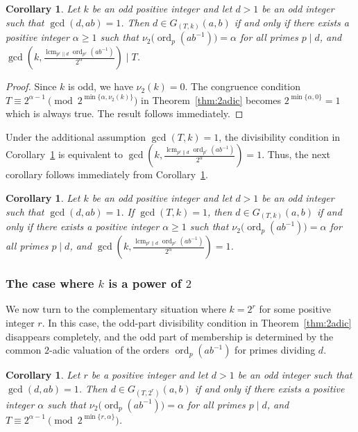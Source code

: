 \documentclass[pdflatex,sn-mathphys-num]{sn-jnl}%
\theoremstyle{thmstyleone}%
\newtheorem{corollary}[theorem]{Corollary}%
\theoremstyle{thmstyletwo}%
\theoremstyle{thmstylethree}%
\newcommand{\ord}{\operatorname{ord}}
\newcommand{\lcm}{\operatorname{lcm}}
\begin{document}
\begin{corollary}\label{thm:k-odd}
Let $k$ be an odd positive integer and let $d>1$ be an odd integer such that  $\gcd(d,ab)=1$. Then $
d\in G_{(T,k)}(a,b)$
if and only if there exists a positive  integer $\alpha\ge 1$ such that
$
\nu_2\bigl(\ord_p(ab^{-1})\bigr)=\alpha$ for all primes $p\mid d$,
and $
\gcd\left(k,\frac{\lcm_{p^e\parallel d}\ord_{p^e}(ab^{-1})}{2^\alpha}\right)\mid T$.
\end{corollary}

\begin{proof}
Since $k$ is odd, we have  $\nu_2(k)=0$.    The congruence condition  $T\equiv 2^{\alpha-1}\pmod{2^{\min\{\alpha,\nu_2(k)\}}}$  in Theorem~\ref{thm:2adic} becomes
 $
2^{\min\{\alpha,0\}}=1$ which is always true. The result follows immediately.
\end{proof}

Under the additional assumption $\gcd(T,k)=1$, the divisibility condition in Corollary~\ref{thm:k-odd} is equivalent to
$
\gcd\left(k,\frac{\lcm_{p^e\parallel d}\ord_{p^e}(ab^{-1})}{2^\alpha}\right)=1$.
Thus, the next corollary  follows immediately  from Corollary~\ref{thm:k-odd}.

\begin{corollary}\label{cor:k-odd-coprime}
Let $k$ be an odd positive integer and let $d>1$ be an odd  integer such that  $\gcd(d,ab)=1$. If
$
\gcd(T,k)=1$,
then
$
d\in G_{(T,k)}(a,b)$
if and only if there exists a positive  integer $\alpha\ge 1$ such that
$
\nu_2\bigl(\ord_p(ab^{-1})\bigr)=\alpha$ for all primes $p\mid d$,
and
$
\gcd\left(k,\frac{\lcm_{p^e\parallel d}\ord_{p^e}(ab^{-1})}{2^\alpha}\right)=1
$.
\end{corollary}


 

\subsubsection{The case where $k$ is a power of $2$}

We now turn to the complementary situation where $
k=2^r$ for some positive integer $r$.
In this case, the odd-part divisibility condition in Theorem~\ref{thm:2adic} disappears completely, and the odd part of membership is  determined by the common $2$-adic valuation of the orders $\ord_p(ab^{-1})$ for primes dividing $d$.

\begin{corollary}\label{thm:k-2power}
Let $r$ be a positive integer and let $d>1$ be an odd integer such that  $\gcd(d,ab)=1$. Then $
d\in G_{(T,2^r)}(a,b)$ 
if and only if there exists a positive integer $\alpha$ such that $
\nu_2\bigl(\ord_p(ab^{-1})\bigr)=\alpha$ 
for all  primes $ p\mid d$,
and
$
T\equiv 2^{\alpha-1}\pmod{2^{\min\{r,\alpha\}}}$.
\end{corollary}
\end{document}
